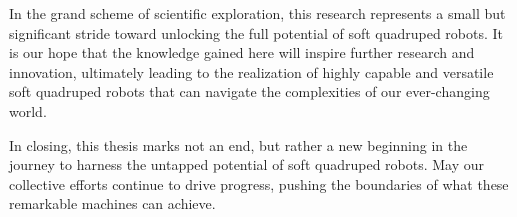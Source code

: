 In the grand scheme of scientific exploration, this research represents a small but significant stride toward unlocking the full potential of soft quadruped robots. It is our hope that the knowledge gained here will inspire further research and innovation, ultimately leading to the realization of highly capable and versatile soft quadruped robots that can navigate the complexities of our ever-changing world.

In closing, this thesis marks not an end, but rather a new beginning in the journey to harness the untapped potential of soft quadruped robots. May our collective efforts continue to drive progress, pushing the boundaries of what these remarkable machines can achieve.






